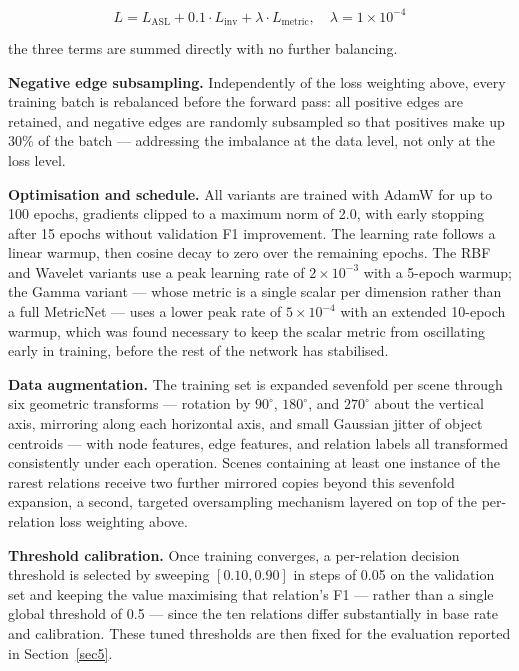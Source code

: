 \documentclass[sn-mathphys,Numbered]{sn-jnl}
\begin{document}
\begin{equation}
L = L_{\text{ASL}} + 0.1 \cdot L_{\text{inv}} + \lambda \cdot L_{\text{metric}}, \quad \lambda = 1\times10^{-4}
\label{eq:loss}
\end{equation}

the three terms are summed directly with no further balancing.

\textbf{Negative edge subsampling.} Independently of the loss weighting above, every training batch is rebalanced before the forward pass: all positive edges are retained, and negative edges are randomly subsampled so that positives make up 30\% of the batch --- addressing the imbalance at the data level, not only at the loss level.

\textbf{Optimisation and schedule.} All variants are trained with AdamW for up to 100 epochs, gradients clipped to a maximum norm of 2.0, with early stopping after 15 epochs without validation F1 improvement. The learning rate follows a linear warmup, then cosine decay to zero over the remaining epochs. The RBF and Wavelet variants use a peak learning rate of $2\times10^{-3}$ with a 5-epoch warmup; the Gamma variant --- whose metric is a single scalar per dimension rather than a full MetricNet --- uses a lower peak rate of $5\times10^{-4}$ with an extended 10-epoch warmup, which was found necessary to keep the scalar metric from oscillating early in training, before the rest of the network has stabilised.

\textbf{Data augmentation.} The training set is expanded sevenfold per scene through six geometric transforms --- rotation by $90^\circ$, $180^\circ$, and $270^\circ$ about the vertical axis, mirroring along each horizontal axis, and small Gaussian jitter of object centroids --- with node features, edge features, and relation labels all transformed consistently under each operation. Scenes containing at least one instance of the rarest relations receive two further mirrored copies beyond this sevenfold expansion, a second, targeted oversampling mechanism layered on top of the per-relation loss weighting above.

\textbf{Threshold calibration.} Once training converges, a per-relation decision threshold is selected by sweeping $[0.10, 0.90]$ in steps of 0.05 on the validation set and keeping the value maximising that relation's F1 --- rather than a single global threshold of 0.5 --- since the ten relations differ substantially in base rate and calibration. These tuned thresholds are then fixed for the evaluation reported in Section~\ref{sec5}.
\end{document}
